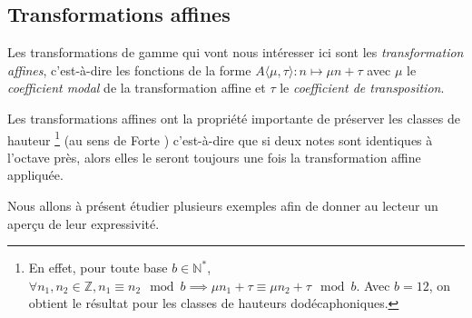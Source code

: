 \subsection{Transformations affines}

Les transformations de gamme qui vont nous intéresser ici sont les \emph{transformation affines}, c'est-à-dire les fonctions de la forme $A\langle\mu,\tau\rangle : n \mapsto \mu n + \tau$ avec $\mu$ le \emph{coefficient modal} de la transformation affine et $\tau$ le \emph{coefficient de transposition}. 

Les transformations affines ont la propriété importante de préserver les classes de hauteur \footnote{En effet, pour toute base $b\in \mathbb{N}^*$, $\forall n_1,n_2 \in \mathbb{Z}, n_1 \equiv n_2 \mod b \implies \mu n_1 + \tau \equiv \mu n_2 + \tau \mod b$. Avec $b=12$, on obtient le résultat pour les classes de hauteurs dodécaphoniques. }  (au sens de Forte \cite{forte1973structure}) c'est-à-dire que si deux notes sont identiques à l'octave près, alors elles le seront toujours une fois la transformation affine appliquée. 

Nous allons à présent étudier plusieurs exemples afin de donner au lecteur un aperçu de leur expressivité.